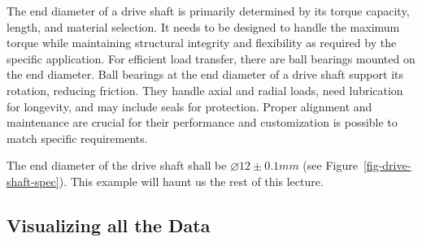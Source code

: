 \documentclass[
  a4paper,
]{scrbook}
\begin{document}
The end diameter of a drive shaft is primarily determined by its torque
capacity, length, and material selection. It needs to be designed to
handle the maximum torque while maintaining structural integrity and
flexibility as required by the specific application. For efficient load
transfer, there are ball bearings mounted on the end diameter. Ball
bearings at the end diameter of a drive shaft support its rotation,
reducing friction. They handle axial and radial loads, need lubrication
for longevity, and may include seals for protection. Proper alignment
and maintenance are crucial for their performance and customization is
possible to match specific requirements.

The end diameter of the drive shaft shall be \(\varnothing 12\pm0.1mm\)
(see Figure~\ref{fig-drive-shaft-spec}). This example will haunt us the
rest of this lecture.

\subsection{Visualizing all the Data}\label{visualizing-all-the-data}
\end{document}
